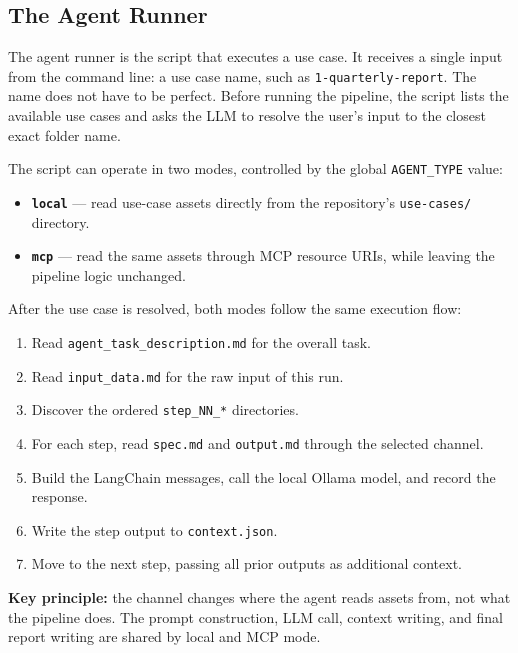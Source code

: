 \documentclass[12pt, a4paper]{article}
\begin{document}
\subsection{The Agent Runner}

The agent runner is the script that executes a use case. It receives a single input from the command line: a use case name, such as \texttt{1-quarterly-report}. The name does not have to be perfect. Before running the pipeline, the script lists the available use cases and asks the LLM to resolve the user's input to the closest exact folder name.

The script can operate in two modes, controlled by the global \texttt{AGENT\_TYPE} value:

\begin{itemize}[leftmargin=1.5em]
  \item \textbf{\texttt{local}} --- read use-case assets directly from the repository's \texttt{use-cases/} directory.
  \item \textbf{\texttt{mcp}} --- read the same assets through MCP resource URIs, while leaving the pipeline logic unchanged.
\end{itemize}

After the use case is resolved, both modes follow the same execution flow:

\begin{enumerate}[leftmargin=1.5em]
  \item Read \texttt{agent\_task\_description.md} for the overall task.
  \item Read \texttt{input\_data.md} for the raw input of this run.
  \item Discover the ordered \texttt{step\_NN\_*} directories.
  \item For each step, read \texttt{spec.md} and \texttt{output.md} through the selected channel.
  \item Build the LangChain messages, call the local Ollama model, and record the response.
  \item Write the step output to \texttt{context.json}.
  \item Move to the next step, passing all prior outputs as additional context.
\end{enumerate}

\begin{notebox}
\textbf{Key principle:} the channel changes where the agent reads assets from, not what the pipeline does. The prompt construction, LLM call, context writing, and final report writing are shared by local and MCP mode.
\end{notebox}
\end{document}
